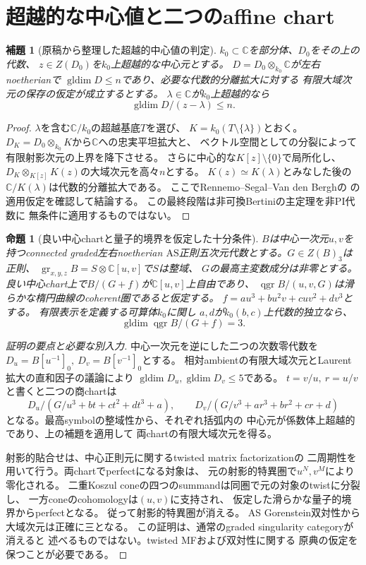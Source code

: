 \documentclass[11pt,a4paper]{ltjsarticle}
\newtheorem{proposition}[theorem]{命題}
\newtheorem{lemma}[theorem]{補題}
\newcommand{\CC}{\mathbb C}
\newcommand{\qgr}{\operatorname{qgr}}
\newcommand{\gldim}{\operatorname{gldim}}
\newcommand{\gr}{\operatorname{gr}}
\newcommand{\AS}{\mathrm{AS}}
\begin{document}
\section{超越的な中心値と二つのaffine chart}
\begin{lemma}[原稿から整理した超越的中心値の判定]\label{lem:transcendental}
$k_0\subset\CC$を部分体、$D_0$をその上の代数、
$z\in Z(D_0)$を$k_0$上超越的な中心元とする。
$D=D_0\otimes_{k_0}\CC$が左右noetherianで
$\gldim D\le n$であり、必要な代数的分離拡大に対する
有限大域次元の保存の仮定が成立するとする。
$\lambda\in\CC$が$k_0$上超越的なら
\[
 \gldim D/(z-\lambda)\le n.
\]
\end{lemma}
\begin{proof}
$\lambda$を含む$\CC/k_0$の超越基底$T$を選び、
$K=k_0(T\setminus\{\lambda\})$とおく。
$D_K=D_0\otimes_{k_0}K$から$\CC$への忠実平坦拡大と、
ベクトル空間としての分裂によって有限射影次元の上界を降下させる。
さらに中心的な$K[z]\setminus\{0\}$で局所化し、
$D_K\otimes_{K[z]}K(z)$の大域次元を高々$n$とする。
$K(z)\simeq K(\lambda)$とみなした後の
$\CC/K(\lambda)$は代数的分離拡大である。
ここでRennemo--Segal--Van den Berghの
\cite[Lemmas 3.2--3.3]{RSV}の適用仮定を確認して結論する。
この最終段階は非可換Bertiniの主定理を非PI代数に
無条件に適用するものではない。
\end{proof}
\begin{proposition}[良い中心chartと量子的境界を仮定した十分条件]
$B$は中心一次元$u,v$を持つconnected graded左右noetherian
$\AS$正則五次元代数とする。$G\in Z(B)_3$は正則、
$\gr_{x,y,z}B=S\otimes\CC[u,v]$で$S$は整域、
$G$の最高主変数成分は非零とする。
良い中心chart上で$B/(G+f)$が$\CC[u,v]$上自由であり、
$\qgr B/(u,v,G)$は滑らかな楕円曲線のcoherent圏であると仮定する。
$f=au^3+bu^2v+cuv^2+dv^3$とする。
有限表示を定義する可算体$k_0$に関し
$a,d$が$k_0(b,c)$上代数的独立なら、
\[
 \gldim\qgr B/(G+f)=3.
\]
\end{proposition}
\begin{proof}[証明の要点と必要な別入力]
中心一次元を逆にした二つの次数零代数を
$D_u=B[u^{-1}]_0,\ D_v=B[v^{-1}]_0$とする。
相対ambientの有限大域次元とLaurent拡大の直和因子の議論により
$\gldim D_u,\gldim D_v\le5$である。
$t=v/u,\ r=u/v$と書くと二つの商chartは
\[
 D_u/(G/u^3+bt+ct^2+dt^3+a),\qquad
 D_v/(G/v^3+ar^3+br^2+cr+d)
\]
となる。最高symbolの整域性から、それぞれ括弧内の
中心元が係数体上超越的であり、上の補題を適用して
両chartの有限大域次元を得る。

射影的貼合せは、中心正則元に関するtwisted matrix factorizationの
二周期性を用いて行う。両chartでperfectになる対象は、
元の射影的特異圏で$u^N,v^M$により零化される。
二重Koszul coneの四つのsummandは同圏で元の対象のtwistに分裂し、
一方coneのcohomologyは$(u,v)$に支持され、
仮定した滑らかな量子的境界からperfectとなる。
従って射影的特異圏が消える。
AS Gorenstein双対性から大域次元は正確に三となる。
この証明は、通常のgraded singularity categoryが消えると
述べるものではない。twisted MFおよび双対性に関する
原典\cite{CCKM,YZ}の仮定を保つことが必要である。
\end{proof}
\end{document}
